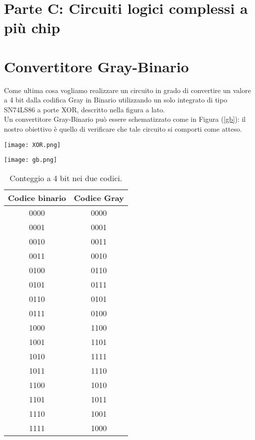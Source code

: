 \documentclass[10pt, a4paper, italian]{article}
\begin{document}
\setcounter{section}{5}
\section*{Parte C: Circuiti logici complessi a più chip}
\section{Convertitore Gray-Binario}
\begin{minipage}{0.7\textwidth}
    Come ultima cosa vogliamo realizzare un circuito in grado di convertire un valore a 4 bit dalla codifica Gray in Binario utilizzando un solo integrato di tipo SN74LS86 a porte XOR, descritto nella figura a lato.\\
    Un convertitore Gray-Binario può essere schematizzato come in Figura (\ref{gb}): il nostro obiettivo è quello di verificare che tale circuito si comporti come atteso.
\end{minipage}
\begin{minipage}{0.3\textwidth}
    \texttt{[image: XOR.png]}
\end{minipage}
\newline
\begin{minipage}{0.5\textwidth}
    \centering
    \texttt{[image: gb.png]}
    \label{gb}
\end{minipage}

\begin{table}[htbp]
    \centering
    \begin{tabular}{c||c}
        Codice binario & Codice Gray \\
        \hline
        \hline
        0000 & 0000\\
        0001 & 0001\\
        0010 & 0011\\
        0011 & 0010\\
        0100 & 0110\\
        0101 & 0111\\
        0110 & 0101\\
        0111 & 0100\\
        1000 & 1100\\
        1001 & 1101\\
        1010 & 1111\\
        1011 & 1110\\
        1100 & 1010\\
        1101 & 1011\\
        1110 & 1001\\
        1111 & 1000\\
        \end{tabular}
    \caption{Conteggio a 4 bit nei due codici.}
    \label{tab: grbin}
\end{table}
\end{document}
